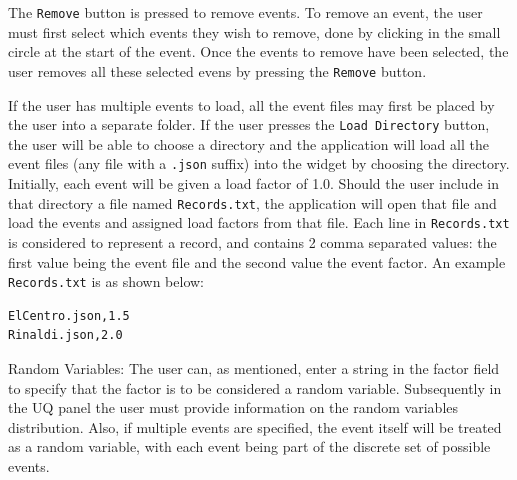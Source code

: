The \texttt{Remove} button is pressed to remove events. To remove an
event, the user must first select which events they wish to remove,
done by clicking in the small circle at the start of the event. Once
the events to remove have been selected, the user removes all these
selected evens by pressing the \texttt{Remove} button.

If the user has multiple events to load, all the event files may first
be placed by the user into a separate folder. If the user presses the
\texttt{Load Directory} button, the user will be able to choose a directory and the
application will load all the event files (any file with a \texttt{.json}
suffix) into the widget by choosing the directory. Initially, each
event will be given a load factor of 1.0.  Should the user include in
that directory a file named \texttt{Records.txt}, the application will open that
file and load the events and assigned load factors from that
file. Each line in \texttt{Records.txt} is considered to represent a record, and
contains 2 comma separated values: the first value being the event
file and the second value the event factor. An example \texttt{Records.txt} is
as shown below:

\begin{verbatim}
ElCentro.json,1.5
Rinaldi.json,2.0
\end{verbatim}

Random Variables: The user can, as mentioned, enter a string in the
factor field to specify that the factor is to be considered a random
variable. Subsequently in the UQ panel the user must provide
information on the random variables distribution. Also, if multiple
events are specified, the event itself will be treated as a random
variable, with each event being part of the discrete set of possible
events.
